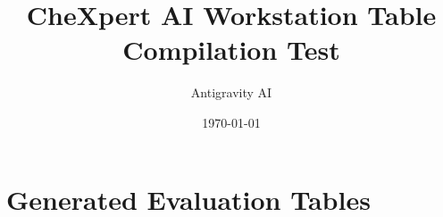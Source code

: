 \documentclass{article}
\title{CheXpert AI Workstation Table Compilation Test}
\author{Antigravity AI}
\date{\today}
\begin{document}
\maketitle

\section{Generated Evaluation Tables}


\end{document}
